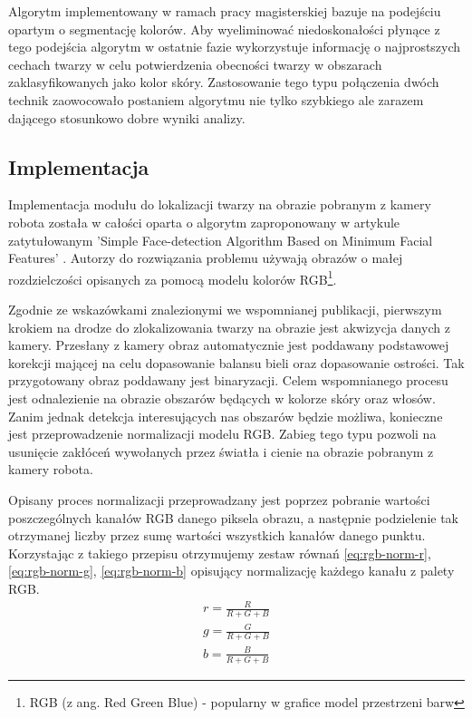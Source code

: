 Algorytm implementowany w ramach pracy magisterskiej bazuje na podejściu opartym
o segmentację kolorów. Aby wyeliminować niedoskonałości płynące z tego podejścia
algorytm w ostatnie fazie wykorzystuje informację o najprostszych cechach twarzy
w celu potwierdzenia obecności twarzy w obszarach zaklasyfikowanych jako kolor
skóry. Zastosowanie tego typu połączenia dwóch technik zaowocowało postaniem
algorytmu nie tylko szybkiego ale zarazem dającego stosunkowo dobre wyniki
analizy.

\subsection{Implementacja}
Implementacja modułu do lokalizacji twarzy na obrazie pobranym z kamery robota
została w całości oparta o algorytm zaproponowany w artykule zatytułowanym 'Simple Face-detection Algorithm Based on Minimum
Facial Features' \cite{SimpleFaceDetectionAlgorithm}. Autorzy do rozwiązania
problemu używają obrazów o małej rozdzielczości opisanych za pomocą modelu
kolorów RGB\footnote{RGB (z ang. Red Green Blue) - popularny w grafice model
przestrzeni barw}.

Zgodnie ze wskazówkami znalezionymi we wspomnianej publikacji, pierwszym krokiem
na drodze do zlokalizowania twarzy na obrazie jest akwizycja danych z kamery.
Przesłany z kamery obraz automatycznie jest poddawany podstawowej korekcji
mającej na celu dopasowanie balansu bieli oraz  dopasowanie ostrości. Tak
przygotowany obraz poddawany jest binaryzacji. Celem wspomnianego procesu jest
odnalezienie na obrazie obszarów będących w kolorze skóry oraz włosów. Zanim
jednak detekcja interesujących nas obszarów będzie możliwa, konieczne jest
przeprowadzenie normalizacji modelu RGB. Zabieg tego typu pozwoli na usunięcie
zakłóceń wywołanych przez światła i cienie na obrazie pobranym z kamery robota.

Opisany proces normalizacji przeprowadzany jest poprzez pobranie wartości
poszczególnych kanałów RGB danego piksela obrazu, a następnie podzielenie tak
otrzymanej liczby przez sumę wartości wszystkich kanałów danego punktu.
Korzystając z takiego przepisu otrzymujemy zestaw równań \ref{eq:rgb-norm-r},
\ref{eq:rgb-norm-g}, \ref{eq:rgb-norm-b} opisujący normalizację każdego kanału z
palety RGB.
\begin{eqnarray}
\label{eq:rgb-norm-r}
r = \frac{R}{R + G +B}\\
\label{eq:rgb-norm-g}
g = \frac{G}{R + G +B}\\
\label{eq:rgb-norm-b}
b = \frac{B}{R + G +B}
\end{eqnarray} 

